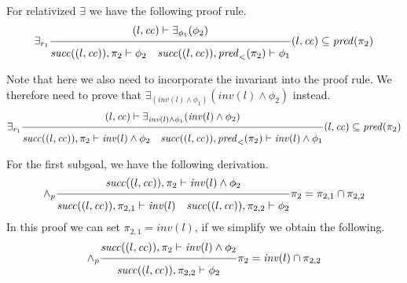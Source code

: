 \documentclass{article}
\newcommand{\proofrule}[3][]{#1 \frac{\raisebox{.7ex}{\normalsize{$#2$}}}
  {\raisebox{-1.0ex}{\normalsize{$#3$}}}}
\newcommand{\placeholder}[1][]{\pi_{#1}}
\newcommand{\loc}{l}
\newcommand{\region}{\mathit{cc}}
\newcommand{\suc}{\mathit{succ}}
\newcommand{\pre}{\mathit{pred}}
\newcommand{\inv}{\mathit{inv}}
\begin{document}

For relativized $\exists$ we have the following proof rule.
\[
\proofrule[\exists_{r_1}]
{(\loc, \region) \vdash \exists_{\phi_1}(\phi_2)}
{\suc((\loc,\region)), \placeholder[2] \vdash \phi_2
\quad
\suc((\loc, \region)), \pre_{<}(\placeholder[2]) \vdash \phi_1
}
(\loc, \region) \subseteq \pre(\placeholder[2])
\]

Note that here we also need to incorporate the invariant into the proof rule. We therefore
need to prove that $\exists_{(\inv(\loc) \land \phi_1)}(\inv(\loc) \land \phi_2)$ instead.
\[
\proofrule[\exists_{r_1}]
{(\loc, \region) \vdash \exists_{\inv(\loc) \land \phi_1}(\inv(\loc) \land \phi_2)}
{\suc((\loc,\region)), \placeholder[2] \vdash \inv(\loc) \land \phi_2
\quad
\suc((\loc, \region)), \pre_{<}(\placeholder[2]) \vdash \inv(\loc) \land \phi_1
}
(\loc, \region) \subseteq \pre(\placeholder[2])
\]

For the first subgoal, we have the following derivation.
\[
\proofrule[\land_p]
{\suc((\loc,\region)), \placeholder[2] \vdash \inv(\loc) \land \phi_2}
{\suc((\loc,\region)), \placeholder[2,1] \vdash \inv(\loc)
\quad \suc((\loc,\region)), \placeholder[2,2] \vdash \phi_2}
\placeholder[2] = \placeholder[2,1] \cap \placeholder[2,2]
\]
In this proof we can set $\placeholder[2,1] = \inv(\loc)$, if we simplify we obtain the following.
\[
\proofrule[\land_p]
{\suc((\loc,\region)), \placeholder[2] \vdash \inv(\loc) \land \phi_2}
{\suc((\loc,\region)), \placeholder[2,2] \vdash \phi_2}
\placeholder[2] = \inv(\loc) \cap \placeholder[2,2]
\]
\end{document}
